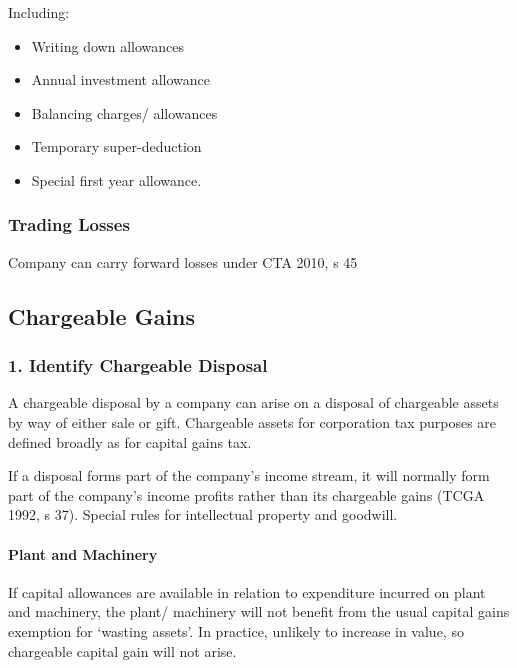 \documentclass[
]{article}
\providecommand{\tightlist}{%
  \setlength{\itemsep}{0pt}\setlength{\parskip}{0pt}}
\begin{document}
Including:

\begin{itemize}
\tightlist
\item
  Writing down allowances
\item
  Annual investment allowance
\item
  Balancing charges/ allowances
\item
  Temporary super-deduction
\item
  Special first year allowance.
\end{itemize}

\hypertarget{trading-losses}{%
\subsubsection{Trading Losses}\label{trading-losses}}

Company can carry forward losses under CTA 2010, s 45

\hypertarget{chargeable-gains}{%
\subsection{Chargeable Gains}\label{chargeable-gains}}

\hypertarget{identify-chargeable-disposal}{%
\subsubsection{1. Identify Chargeable
Disposal}\label{identify-chargeable-disposal}}

A chargeable disposal by a company can arise on a disposal of chargeable
assets by way of either sale or gift. Chargeable assets for corporation
tax purposes are defined broadly as for capital gains tax.

If a disposal forms part of the company's income stream, it will
normally form part of the company's income profits rather than its
chargeable gains (TCGA 1992, s 37). Special rules for intellectual
property and goodwill.

\hypertarget{plant-and-machinery}{%
\paragraph{Plant and Machinery}\label{plant-and-machinery}}

If capital allowances are available in relation to expenditure incurred
on plant and machinery, the plant/ machinery will not benefit from the
usual capital gains exemption for `wasting assets'. In practice,
unlikely to increase in value, so chargeable capital gain will not
arise.
\end{document}
